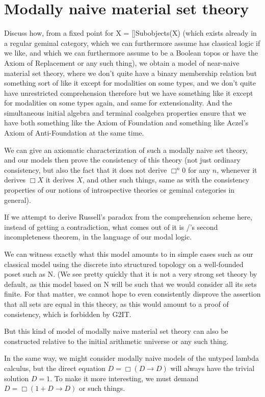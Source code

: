 \filestart

\section{Modally naive material set theory}
\begin{TODOblock}
Discuss how, from a fixed point for X = []Subobjects(X) (which exists already in a regular geminal category, which we can furthermore assume has classical logic if we like, and which we can furthermore assume to be a Boolean topos or have the Axiom of Replacement or any such thing), we obtain a model of near-naive material set theory, where we don't quite have a binary membership relation but something sort of like it except for modalities on some types, and we don't quite have unrestricted comprehension therefore but we have something like it except for modalities on some types again, and same for extensionality. And the simultaneous initial algebra and terminal coalgebra properties ensure that we have both something like the Axiom of Foundation and something like Aczel's Axiom of Anti-Foundation at the same time.

We can give an axiomatic characterization of such a modally naive set theory, and our models then prove the consistency of this theory (not just ordinary consistency, but also the fact that it does not derive $\Box^n 0$ for any $n$, whenever it derives $\Box X$ it derives $X$, and other such things, same as with the consistency properties of our notions of introspective theories or geminal categories in general).

If we attempt to derive Russell's paradox from the comprehension scheme here, instead of getting a contradiction, what comes out of it is \Goedel/'s second incompleteness theorem, in the language of our modal logic.

We can witness exactly what this model amounts to in simple cases such as our classical model using the discrete into structured topology on a well-founded poset such as N. (We see pretty quickly that it is not a very strong set theory by default, as this model based on N will be such that we would consider all its sets finite. For that matter, we cannot hope to even consistently disprove the assertion that all sets are equal in this theory, as this would amount to a proof of consistency, which is forbidden by G2IT.

But this kind of model of modally naive material set theory can also be constructed relative to the initial arithmetic universe or any such thing.

In the same way, we might consider modally naive models of the untyped lambda calculus, but the direct equation $D = \Box(D \to D)$ will always have the trivial solution $D = 1$. To make it more interesting, we must demand $D = \Box(1 + D \to D)$ or such things.
\end{TODOblock}

\fileend